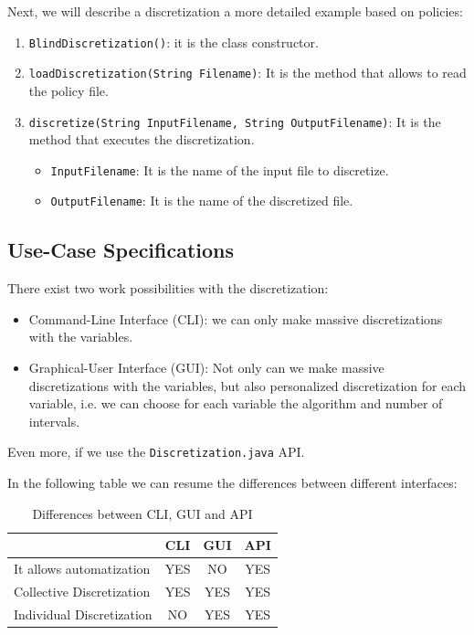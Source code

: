 Next, we will describe a discretization a more detailed example based on policies:
\begin{enumerate}
	\item	\verb=BlindDiscretization()=: it is the class constructor.
	\item	\verb=loadDiscretization(String Filename)=: It is the method that allows to read
			the policy file.
	\item	\verb=discretize(String InputFilename, String OutputFilename)=: It is the method that executes
			the discretization.
		\begin{itemize}
			\item	\verb=InputFilename=: It is the name of the input file to discretize.
			\item	\verb=OutputFilename=: It is the name of the discretized file.
		\end{itemize}
\end{enumerate}

\subsection{Use-Case Specifications}
There exist two work possibilities with the discretization:
\begin{itemize}
	\item	Command-Line Interface (CLI): we can only make massive discretizations with the va\-ria\-bles.
	\item	Graphical-User Interface (GUI): Not only can we make massive discretizations with the variables,
			but also personalized discretization for each variable, i.e. we can choose for each variable
			the algorithm and number of intervals.
\end{itemize}

Even more, if we use the \verb=Discretization.java= API.

In the following table we can resume the differences between different interfaces:
\begin{table}[hbt]
\begin{center}
\begin{minipage}[b]{5cm}
\begin{tabular}{|l|c|c|c|}
	\hline
				   &    CLI	&	GUI	&	API	\\
	\hline
	\hline
	It allows automatization	   &	YES	&	NO	&	YES	\\
	\hline
	Collective Discretization   &	YES	&	YES	&	YES	\\
	\hline
	Individual Discretization  &	NO	&	YES	&	YES	\\
	\hline
\end{tabular}
\end{minipage}
\end{center}
\caption{Differences between CLI, GUI and API}
\label{cap08:tab01}
\end{table}

